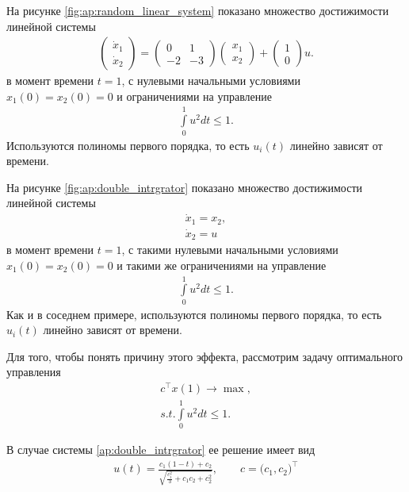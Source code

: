 \documentclass[../main.tex]{subfiles}
\begin{document}
 На рисунке \ref{fig:ap:random_linear_system} показано множество достижимости линейной системы
 \begin{gather}\label{ap:random_linear_system}
 	\begin{pmatrix} 
 		\dot{x}_1 \\
 		\dot{x}_2 
 	\end{pmatrix} = 
 	\begin{pmatrix}
 		0 & 1 \\
 		-2 & -3
 	\end{pmatrix}
 	\begin{pmatrix} 
 		x_1 \\
 		x_2 
 	\end{pmatrix} +
 	\begin{pmatrix} 1 \\ 0
 	\end{pmatrix} u.
 \end{gather}
 в момент времени $t = 1$, с нулевыми начальными условиями $x_1(0) = x_2(0) = 0 $ и ограничениями на управление 
 \begin{gather*}
 	\int\limits_0^1 u^2dt \leqslant 1.
 \end{gather*}
 Используются полиномы первого порядка, то есть $u_i(t) $ линейно зависят от времени.
 
 На рисунке \ref{fig:ap:double_intrgrator} показано множество достижимости линейной системы
 \begin{gather}\label{ap:double_intrgrator}
 \dot{x}_1 = x_2,\\
 	\dot{x}_2 = u
 \end{gather}
 в момент времени $t = 1$, с такими нулевыми начальными условиями $x_1(0) = x_2(0) = 0 $ и такими же ограничениями на управление 
 \begin{gather*}
 	\int\limits_0^1 u^2dt \leqslant 1.
 \end{gather*}
 Как и в соседнем примере, используются полиномы первого порядка, то есть $u_i(t) $ линейно зависят от времени.
 
 Для того, чтобы понять причину этого эффекта, рассмотрим задачу оптимального управления
 \begin{gather*}
 	c^{\top} x(1) \rightarrow \max, \\
 	s.t. 	\int\limits_0^1 u^2dt \leqslant 1.
 \end{gather*}
 
 В случае системы \eqref{ap:double_intrgrator} ее решение имеет вид
 \begin{gather*}
 	u(t) = \frac{c_1(1 - t) + c_2}{\sqrt{\frac{c_1^2}{3} + c_1 c_2 + c_2^2}}, \qquad c = \big(c_1, c_2 \big)^{\top}
 \end{gather*}
 
\end{document}
